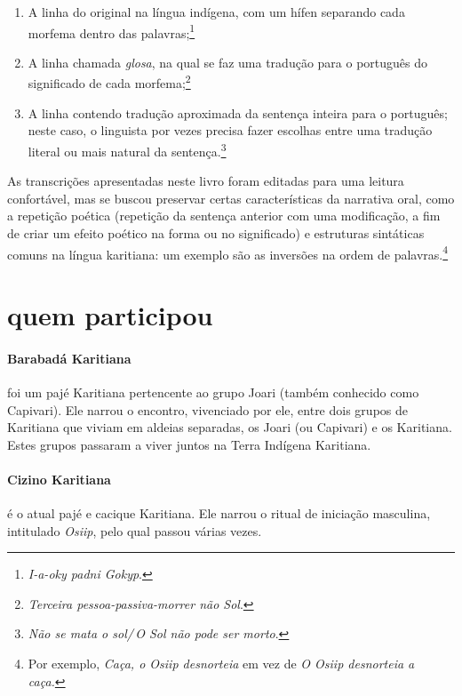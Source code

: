 \begin{enumerate}
\item A linha do original na língua indígena, com um hífen
separando cada morfema dentro das palavras;\footnote{\textit{I-a-oky padni Gokyp}.}

\item A linha chamada
\textit{glosa}, na qual se faz uma tradução para o português do
significado de cada morfema;\footnote{\textit{Terceira pessoa-passiva-morrer não Sol}.}

\item A linha contendo tradução
aproximada da sentença inteira para o português; neste caso, o linguista
por vezes precisa fazer escolhas entre uma tradução literal ou mais natural da sentença.\footnote{\textit{Não se mata o sol/\,O Sol não pode ser morto}.}

\end{enumerate}

As transcrições apresentadas neste livro foram editadas para uma leitura
confortável, mas se buscou preservar certas características da narrativa
oral, como a repetição poética (repetição da sentença anterior com uma
modificação, a fim de criar um efeito poético na forma ou no
significado) e estruturas sintáticas comuns na língua karitiana: um
exemplo são as inversões na ordem de palavras.\footnote{Por exemplo, \textit{Caça, o
Osiip desnorteia} em vez de \textit{O Osiip desnorteia a caça.}}

\section{quem participou}

\paragraph{Barabadá Karitiana} foi um pajé Karitiana pertencente ao grupo Joari
 (também conhecido como Capivari). Ele narrou o encontro, vivenciado por
 ele, entre dois grupos de Karitiana que viviam em aldeias separadas, os
 Joari (ou Capivari) e os Karitiana. Estes grupos passaram a viver juntos
 na Terra Indígena Karitiana.

 \paragraph{Cizino Karitiana} é o atual pajé e cacique Karitiana. Ele narrou o ritual
 de iniciação masculina, intitulado \textit{Osiip}, pelo qual passou várias
 vezes.

